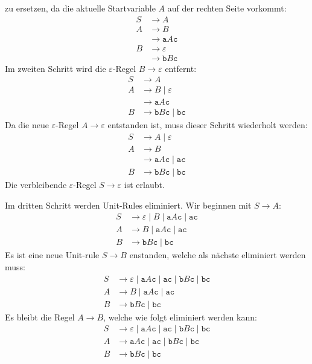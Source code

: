 \begin{loesung}
\begin{teilaufgaben}
zu ersetzen, da die aktuelle Startvariable $A$ auf der rechten Seite vorkommt:
\begin{align*}
S&\rightarrow A\\
A&\rightarrow B \\
 &\rightarrow \texttt{a} A \texttt{c} \\
B&\rightarrow \varepsilon \\
 &\rightarrow \texttt{b} B \texttt{c}
\end{align*}
Im zweiten Schritt wird die $\varepsilon$-Regel $B\to\varepsilon$ entfernt:
\begin{align*}
S&\rightarrow A\\
A&\rightarrow B \mid  \varepsilon\\
 &\rightarrow \texttt{a} A \texttt{c} \\
B&\rightarrow \texttt{b} B \texttt{c} \mid  \texttt{b} \texttt{c}
\end{align*}
Da die neue $\varepsilon$-Regel $A\to\varepsilon$ entstanden ist, muss
dieser Schritt wiederholt werden:
\begin{align*}
S&\rightarrow A \mid  \varepsilon\\
A&\rightarrow B \\
 &\rightarrow \texttt{a} A \texttt{c} \mid  \texttt{ac}\\
B&\rightarrow \texttt{b} B \texttt{c} \mid  \texttt{b} \texttt{c}
\end{align*}
Die verbleibende $\varepsilon$-Regel $S\to\varepsilon$ ist erlaubt.

Im dritten Schritt werden Unit-Rules eliminiert.
Wir beginnen mit $S\to A$:
\begin{align*}
S&\rightarrow \varepsilon \mid  B \mid  \texttt{a}A\texttt{c} \mid \texttt{ac}\\
A&\rightarrow B \mid  \texttt{a} A \texttt{c} \mid  \texttt{ac}\\
B&\rightarrow \texttt{b} B \texttt{c} \mid  \texttt{b} \texttt{c}
\end{align*}
Es ist eine neue Unit-rule $S\to B$ enstanden, welche als nächste eliminiert
werden muss:
\begin{align*}
S&\rightarrow \varepsilon \mid  \texttt{a}A\texttt{c} \mid \texttt{ac}
\mid  \texttt{b} B \texttt{c} \mid  \texttt{b} \texttt{c}
\\
A&\rightarrow B \mid  \texttt{a} A \texttt{c} \mid  \texttt{ac}\\
B&\rightarrow \texttt{b} B \texttt{c} \mid  \texttt{b} \texttt{c}
\end{align*}
Es bleibt die Regel $A\to B$, welche wie folgt eliminiert werden kann:
\begin{align*}
S&\rightarrow \varepsilon \mid  \texttt{a}A\texttt{c} \mid \texttt{ac}
\mid  \texttt{b} B \texttt{c} \mid  \texttt{b} \texttt{c}
\\
A&\rightarrow \texttt{a} A \texttt{c} \mid  \texttt{ac} \mid 
 \texttt{b} B \texttt{c} \mid  \texttt{b} \texttt{c} \\
B&\rightarrow \texttt{b} B \texttt{c} \mid  \texttt{b} \texttt{c}
\end{align*}


\end{teilaufgaben}
\end{loesung}

